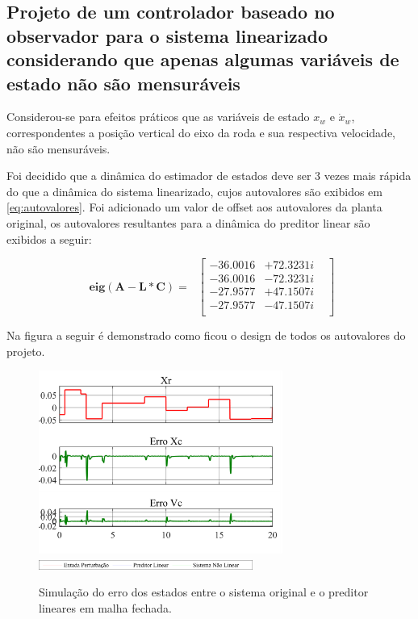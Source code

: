 \documentclass[a4paper]{ifacconf}
\begin{document}
\subsection{Projeto de um controlador baseado no observador para o sistema linearizado considerando
que apenas algumas variáveis de estado não são mensuráveis}

Considerou-se para efeitos práticos que as variáveis de estado $x_w$ e $\dot{x}_w$, correspondentes a posição vertical do eixo da roda e sua respectiva velocidade, não são mensuráveis.

Foi decidido que a dinâmica do estimador de estados deve ser 3 vezes  mais rápida do que a dinâmica do sistema linearizado, cujos autovalores são exibidos em \ref{eq:autovalores}. Foi adicionado um valor de offset aos autovalores da planta original, os autovalores resultantes para a dinâmica do preditor linear são exibidos a seguir:

 \begin{equation} \label{eq:autovalores_pred}
        \begin{split}
              \mathbf{eig(A-L*C)}=\
        \end{split}
        \begin{bmatrix}
             -36.0016& +72.3231i&\\
             -36.0016& -72.3231i&\\
             -27.9577& +47.1507i&\\
             -27.9577& -47.1507i&\\
        \end{bmatrix}
    \end{equation}

Na figura a seguir é demonstrado como ficou o design de todos os autovalores do projeto.

    \FloatBarrier
    \begin{figure}[htbp]
        \begin{centering}
            \includegraphics[width=8cm]{img/simulaca_temporal_preditor_linear_erro.png}
            \includegraphics[width=7cm]{img/simulaca_temporal_preditor_linear_erro_leg.png}
            \caption{Simulação do erro dos estados entre o sistema original e o preditor lineares em malha fechada.}
            \label{fig:simulaca_temporal_linear_perturbacao}
        \end{centering}
    \end{figure}
    \FloatBarrier
    
\end{document}
